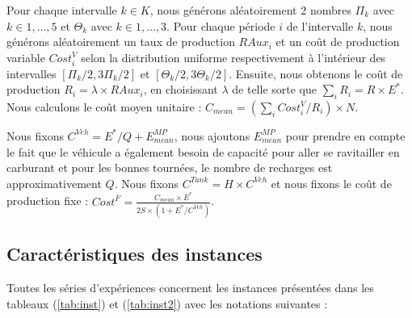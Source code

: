 {Pour chaque intervalle $k \in K$, nous générons aléatoirement 2 nombres $\Pi_k$ avec $k \in 1, \dots, 5$ et $\Theta_k$ avec $k \in 1, \dots, 3$.
Pour chaque période $i$ de l'intervalle $k$, nous générons aléatoirement un taux de production $RAux_i$
et un coût de production variable $Cost^V_i$
selon la distribution uniforme respectivement à l'intérieur des intervalles $[\Pi_k/2, 3\Pi_k/2]$ et $[\Theta_k/2, 3\Theta_k/2]$.
Ensuite, nous obtenons le coût de production $R_i = \lambda\times RAux_i$,
en choisissant $\lambda$ de telle sorte que $\sum_i R_i=R\times E^*$. Nous calculons le coût moyen unitaire : $C_{mean}=(\sum_i Cost_i^V/R_i)\times N$. 

Nous fixons $C^{Veh} = E^*/Q + E^{MP}_{mean}$, nous ajoutons $E^{MP}_{mean}$ pour prendre en compte le fait que le véhicule
a également besoin de capacité pour aller se ravitailler en carburant et pour les bonnes tournées, le nombre de recharges est
approximativement $Q$. Nous fixons $C^{Tank} = H \times C^{Veh}$ et nous fixons le coût de production fixe : $Cost^F=\frac{C_{mean}\times E^*}{2S\times (1+E^*/C^{Veh})}$.

\subsection{Caractéristiques des instances}
Toutes les séries d'expériences concernent les instances présentées dans les tableaux (\ref{tab:inst}) et (\ref{tab:inst2}) avec les notations suivantes :

}
